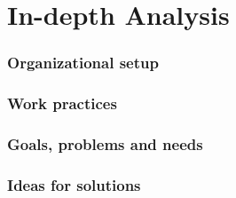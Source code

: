 \part{In-depth Analysis}


\section{Organizational setup}

\section{Work practices}

\section{Goals, problems and needs}

\section{Ideas for solutions}


